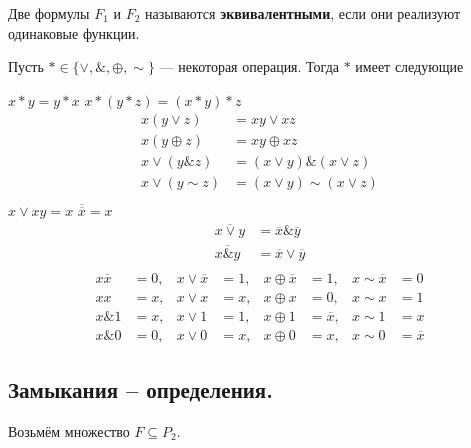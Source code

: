\begin{df}
	Две формулы $F_1$ и $F_2$ называются {\bf эквивалентными},
	если они реализуют одинаковые функции.
\end{df}

Пусть $\ast \in \{\vee, \&, \oplus, \sim \}$ --- некоторая операция. Тогда $\ast$ имеет следующие

\begin{props}
		$x \ast y = y \ast x$
		$x \ast (y \ast z) = (x \ast y) \ast z$
		\begin{align*}
			x (y \vee z) &= xy \vee xz \\
			x (y \oplus z) &= xy \oplus xz \\
			x \vee (y  \&  z) &= (x \vee y) \& (x \vee z) \\
			x \vee (y  \sim  z) &= (x \vee y) \sim (x \vee z) \\
		\end{align*}
		$x \vee xy = x$
		$\overline{\overline{x}} = x$
		\begin{align*}
			\overline{x \vee y} &= \overline{x} \& \overline{y} \\
			\overline{x \& y} &= \overline{x} \vee \overline{y} \\ 
		\end{align*}
	\prpy{}
		\begin{align*} 
			x\overline{x} &= 0, & x \vee \overline{x} &= 1, & x \oplus \overline{x} &= 1, & x \sim \overline{x} &= 0 \\
			xx &= x, & x \vee x &= x, & x \oplus x &= 0, & x \sim x &= 1 \\
			x \& 1 &= x, & x \vee 1 &= 1, & x \oplus 1 &= \overline{x}, & x \sim 1 &= x \\
			x \& 0 &= 0, & x \vee 0 &= x, & x \oplus 0 &= x, & x \sim 0 &= \overline{x}
		\end{align*}
\end{props}


\subsection{Замыкания -- определения.}

Возьмём множество $F \subseteq P_2$.

